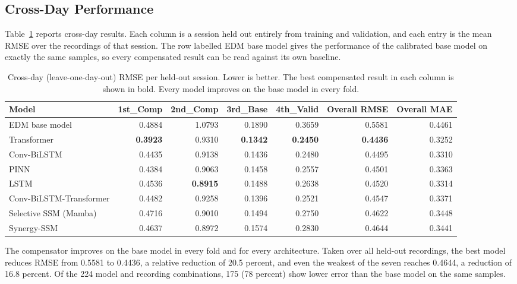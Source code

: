 \subsection{Cross-Day Performance}
\label{sec:crossday}

Table~\ref{tab:crossday} reports cross-day results. Each column is a session
held out entirely from training and validation, and each entry is the mean RMSE
over the recordings of that session. The row labelled EDM base model gives the
performance of the calibrated base model on exactly the same samples, so every
compensated result can be read against its own baseline.

\begin{table}[!t]
\caption{Cross-day (leave-one-day-out) RMSE per held-out session. Lower is
better. The best compensated result in each column is shown in bold. Every
model improves on the base model in every fold.}
\label{tab:crossday}
\centering
\begin{tabular}{lrrrrrr}
\toprule
Model & 1st\_Comp & 2nd\_Comp & 3rd\_Base & 4th\_Valid & Overall RMSE & Overall MAE \\
\midrule
EDM base model          & 0.4884 & 1.0793 & 0.1890 & 0.3659 & 0.5581 & 0.4461 \\
\midrule
Transformer             & \textbf{0.3923} & 0.9310 & \textbf{0.1342} & \textbf{0.2450} & \textbf{0.4436} & 0.3252 \\
Conv-BiLSTM             & 0.4435 & 0.9138 & 0.1436 & 0.2480 & 0.4495 & 0.3310 \\
PINN                    & 0.4384 & 0.9063 & 0.1458 & 0.2557 & 0.4501 & 0.3363 \\
LSTM                    & 0.4536 & \textbf{0.8915} & 0.1488 & 0.2638 & 0.4520 & 0.3314 \\
Conv-BiLSTM-Transformer & 0.4482 & 0.9258 & 0.1396 & 0.2521 & 0.4547 & 0.3371 \\
Selective SSM (Mamba)   & 0.4716 & 0.9010 & 0.1494 & 0.2750 & 0.4622 & 0.3448 \\
Synergy-SSM             & 0.4637 & 0.8972 & 0.1574 & 0.2830 & 0.4644 & 0.3441 \\
\bottomrule
\end{tabular}
\end{table}

The compensator improves on the base model in every fold and for every
architecture. Taken over all held-out recordings, the best model reduces RMSE
from 0.5581 to 0.4436, a relative reduction of 20.5 percent, and even the
weakest of the seven reaches 0.4644, a reduction of 16.8 percent. Of the 224
model and recording combinations, 175 (78 percent) show lower error than the
base model on the same samples.

